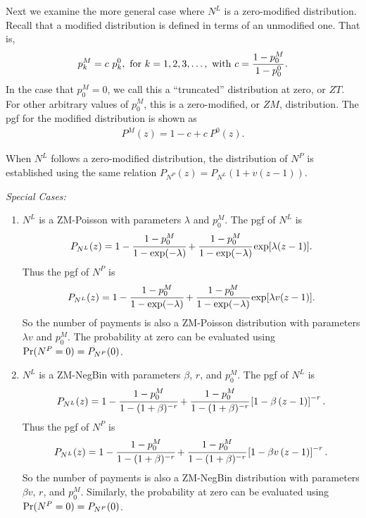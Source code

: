 \documentclass[12pt,letterpaper]{article}
\begin{document}
Next we examine the more general case where $N^L$ is a zero-modified distribution. Recall that a modified distribution is defined in terms of an unmodified one. That is,
\begin{align*}
p_k^M = c~p_k^0, {~\rm for~} k=1,2,3,\ldots,  {~\rm with~}c = \frac{1-p_0^M}{1-p_0^0}.
\end{align*}
In the case that $p_0^M=0$, we call this a ``truncated'' distribution at zero, or $ZT$. For other arbitrary values of $p_0^M$, this is a zero-modified, or $ZM$, distribution. The pgf for the modified distribution is shown as
\begin{eqnarray*}
P^M(z) = 1-c+c~P^0(z).
\end{eqnarray*}


%

When $N^L$ follows a zero-modified distribution, the distribution of $N^P$ is established using the same relation $P_{N^P}(z)=P_{N^L}\left(1+v(z-1)\right)$.


\bigskip
\textit{Special Cases:}
\begin{enumerate}
\item $N^{L}$ is a ZM-Poisson with parameters $\lambda$ and $p_0^{M}$. The pgf of $N^L$ is
$$P_{N^{L}}(z)=1-\cfrac{1-p_0^{M}}{1-\exp(-\lambda)}+\cfrac{1-p_0^{M}}{1-\exp(-\lambda)}\exp[\lambda(z-1)].$$
Thus the pgf of $N^P$ is
$$P_{N^{L}}(z)=1-\cfrac{1-p_0^{M}}{1-\exp(-\lambda)}+\cfrac{1-p_0^{M}}{1-\exp(-\lambda)}\exp[\lambda v(z-1)].$$
So the number of payments is also a ZM-Poisson distribution with parameters $\lambda v$ and $p_0^{M}$. The probability at zero can be evaluated using
${\rm Pr}(N^P=0) = P_{N^P}(0)$.


\item $N^{L}$ is a ZM-NegBin with parameters $\beta$, $r$, and $p_0^{M}$. The pgf of $N^L$ is
$$P_{N^{L}}(z)=1-\cfrac{1-p_0^{M}}{1-(1+\beta)^{-r}}+\cfrac{1-p_0^{M}}{1-(1+\beta)^{-r}}\left[ 1-\beta \left( z-1\right)\right]^{-r}.$$
Thus the pgf of $N^P$ is
$$P_{N^{L}}(z)=1-\cfrac{1-p_0^{M}}{1-(1+\beta)^{-r}}+\cfrac{1-p_0^{M}}{1-(1+\beta)^{-r}}\left[ 1-\beta v\left( z-1\right)\right]^{-r}.$$
So the number of payments is also a ZM-NegBin distribution with parameters $\beta v$, $r$, and $p_0^{M}$. Similarly, the probability at zero can be evaluated using
${\rm Pr}(N^P=0) = P_{N^P}(0)$.
\end{enumerate}
\end{document}
